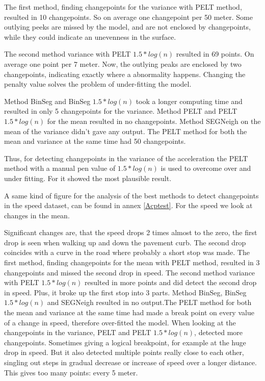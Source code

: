 The first method, finding changepoints for the variance with PELT method, resulted in 10 changepoints. So on average one changepoint per 50 meter. Some outlying peeks are missed by the model, and are not enclosed by changepoints, while they could indicate an unevenness in the surface. 

The second method variance with PELT $1.5*log(n)$ resulted in 69 points. On average one point per 7 meter. Now, the outlying peaks are enclosed by two changepoints, indicating exactly where a abnormality happens. Changing the penalty value solves the problem of under-fitting the model. 

Method BinSeg and BinSeg $1.5*log(n)$ took a longer computing time and resulted in only 5 changepoints for the variance. Method PELT and PELT $1.5*log(n)$ for the mean resulted in no changepoints. Method SEGNeigh on the mean of the variance didn't gave any output. The PELT method for both the mean and variance at the same time had 50 changepoints. 


Thus, for detecting changepoints in the variance of the acceleration the PELT method with a manual pen value of $1.5 * log(n)$ is used to overcome over and under fitting. For it showed the most plausible result.

A same kind of figure for the analysis of the best methods to detect changepoints in the speed dataset, can be found in annex \ref{Acptest}.
For the speed we look at changes in the mean.

Significant changes are, that the speed drops 2 times almost to the zero, the first drop is seen when walking up and down the pavement curb. The second drop coincides with a curve in the road where probably a short stop was made. The first method, finding changepoints for the mean with PELT method, resulted in 3 changepoints and missed the second drop in speed. The second method variance with PELT $1.5*log(n)$ resulted in more points and did detect the second drop in speed. Plus, it broke up the first stop into 3 parts. Method BinSeg, BinSeg $1.5*log(n)$ and SEGNeigh resulted in no output.The PELT method for both the mean and variance at the same time had made a break point on every value of a change in speed, therefore over-fitted the model. 
When looking at the changepoints in the variance, PELT and PELT $1.5*log(n)$, detected more changepoints. Sometimes giving a logical breakpoint, for example at the huge drop in speed. But it also detected multiple points really close to each other, singling out steps in gradual decrease or increase of speed over a longer distance. This gives too many points: every 5 meter. 


